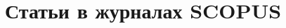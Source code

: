 \documentclass[a4paper,12pt]{report}
\begin{document}
\lstset{language=Pascal} 



\clearpage
{}
\section{Статьи в журналах SCOPUS}	
\begin{refsection} %
\nocite{RCDL-2014,AMSTA-2015} %
\printbibliography[heading=subbibliography] %
\end{refsection}
\end{document}
